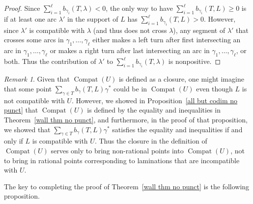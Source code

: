 \documentclass{amsart}
\theoremstyle{definition}
\theoremstyle{remark}
\newtheorem{remark}[proposition]{Remark}
\numberwithin{equation}{section}
\newcommand{\0}{{\mathbf{0}}}
\newcommand{\Compat}{\operatorname{Compat}}
\begin{document}
\begin{proof}
Since $\sum_{i=1}^\ell b_{\gamma_i}(T,\lambda)<0$, the only way to have $\sum_{i=1}^\ell b_{\gamma_i}(T,L)\ge0$ is if at least one arc $\lambda'$ in the support of $L$ has $\sum_{i=1}^\ell b_{\gamma_i}(T,L)>0$.
However, since $\lambda'$ is compatible with $\lambda$ (and thus does not cross $\lambda$), any segment of $\lambda'$ that crosses some arcs in $\gamma_1,\ldots,\gamma_\ell$ either makes a left turn after first intersecting an arc in $\gamma_1,\ldots,\gamma_\ell$ or makes a right turn after last intersecting an arc in $\gamma_1,\ldots,\gamma_\ell$, or both.
Thus the contribution of $\lambda'$ to $\sum_{i=1}^\ell b_{\gamma_i}(T,\lambda)$ is nonpositive.
\end{proof}

\begin{remark}\label{closure not doing weird things}
Given that $\Compat(U)$ is defined as a closure, one might imagine that some point $\sum_{\gamma\in T}b_\gamma(T,L)\gamma^*$ could be in $\Compat(U)$ even though $L$ is not compatible with $U$.
However, we showed in Proposition~\ref{all but codim no punct} that $\Compat(U)$ is defined by the equality and inequalities in Theorem~\ref{wall thm no punct}, and furthermore, in the proof of that proposition, we showed that $\sum_{\gamma\in T}b_\gamma(T,L)\gamma^*$ satisfies the equality and inequalities if and only if $L$ is compatible with $U$.
Thus the closure in the definition of $\Compat(U)$ serves only to bring non-rational points into $\Compat(U)$, not to bring in rational points corresponding to laminations that are incompatible with $U$.
\end{remark}

The key to completing the proof of Theorem~\ref{wall thm no punct} is the following proposition.
\end{document}
